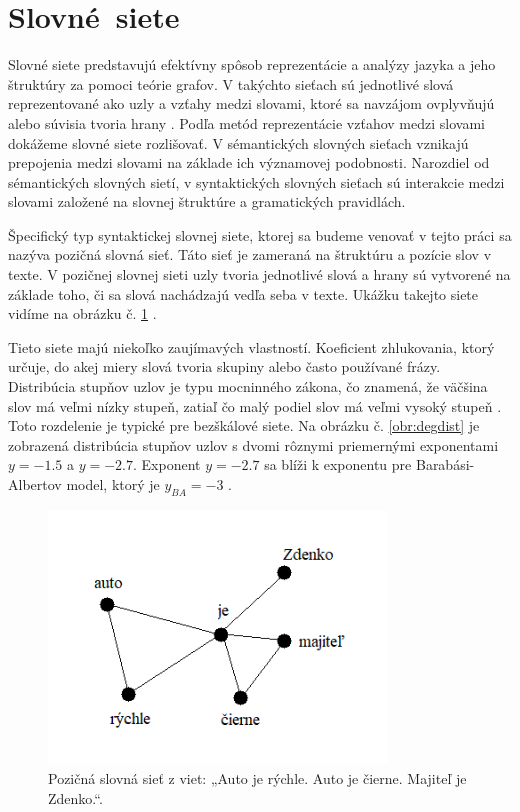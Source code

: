 \section{Slovné~siete}\label{sec:word-networks}

Slovné siete predstavujú efektívny spôsob reprezentácie a analýzy jazyka a jeho štruktúry za pomoci teórie grafov.
V takýchto sieťach sú jednotlivé slová reprezentované ako uzly a vzťahy medzi slovami, ktoré sa navzájom ovplyvňujú alebo súvisia
tvoria hrany \cite{motter2002topology} . Podľa metód reprezentácie vzťahov medzi slovami dokážeme slovné siete rozlišovať.
V sémantických slovných sieťach vznikajú prepojenia medzi slovami na základe ich významovej podobnosti. Narozdiel od sémantických
slovných sietí, v syntaktických slovných sieťach sú interakcie medzi slovami založené na slovnej štruktúre a gramatických pravidlách.

\pagebreak

Špecifický typ syntaktickej slovnej siete, ktorej sa budeme venovať v tejto práci sa nazýva pozičná slovná sieť. Táto sieť je zameraná na štruktúru
a pozície slov v texte. V pozičnej slovnej sieti uzly tvoria jednotlivé slová a hrany sú vytvorené na základe toho, či sa slová nachádzajú
vedľa seba v texte. Ukážku takejto siete vidíme na obrázku č. \ref{obr:wan} .

Tieto siete majú niekoľko zaujímavých vlastností. Koeficient zhlukovania, ktorý určuje, do akej
miery slová tvoria skupiny alebo často používané frázy. Distribúcia stupňov uzlov je
typu mocninného zákona, čo znamená, že väčšina slov má veľmi nízky stupeň, zatiaľ čo malý podiel slov má veľmi vysoký stupeň \cite{dorogovtsev2001language} .
Toto rozdelenie je typické pre bezškálové siete. Na obrázku č. \ref{obr:degdist} je zobrazená distribúcia stupňov uzlov s dvomi
rôznymi priemernými exponentami $y = -1.5$ a $y = -2.7$. Exponent $y = -2.7$ sa blíži k exponentu pre Barabási-Albertov model, ktorý je
$y_{BA} = -3$ \cite{cancho2001small} .

\begin{figure}
    \centerline{\includegraphics[width=0.8\textwidth]{images/wan.png}}
    \caption[Pozičná slovná sieť.]{Pozičná slovná sieť z viet: „Auto je rýchle. Auto je čierne. Majiteľ je Zdenko.“.}
    \label{obr:wan}
\end{figure}

